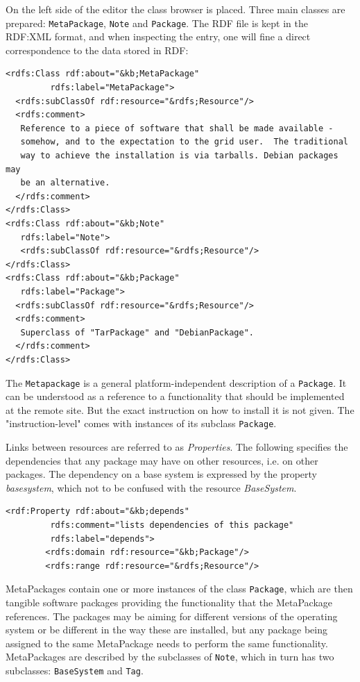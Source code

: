 On the left side of the editor the class browser is placed. Three
main classes are prepared: \texttt{MetaPackage}, \texttt{Note} and
\texttt{Package}. The RDF file is kept in the RDF:XML format, and
when inspecting the entry, one will fine a direct correspondence 
to the data stored in RDF:

\begin{verbatim}
<rdfs:Class rdf:about="&kb;MetaPackage"
         rdfs:label="MetaPackage">
  <rdfs:subClassOf rdf:resource="&rdfs;Resource"/>
  <rdfs:comment>
   Reference to a piece of software that shall be made available -
   somehow, and to the expectation to the grid user.  The traditional
   way to achieve the installation is via tarballs. Debian packages may
   be an alternative.
  </rdfs:comment>
</rdfs:Class>
<rdfs:Class rdf:about="&kb;Note"
   rdfs:label="Note">
   <rdfs:subClassOf rdf:resource="&rdfs;Resource"/>
</rdfs:Class>
<rdfs:Class rdf:about="&kb;Package"
   rdfs:label="Package">
  <rdfs:subClassOf rdf:resource="&rdfs;Resource"/>
  <rdfs:comment>
   Superclass of "TarPackage" and "DebianPackage".
  </rdfs:comment>
</rdfs:Class>
\end{verbatim}

The \texttt{Metapackage} is a general platform-independent description
of a \texttt{Package}. It can be understood as a reference to a functionality
that should be implemented at the remote site. But the exact instruction
on how to install it is not given.  The "instruction-level" comes with
instances of its subclass \texttt{Package}.

Links between resources are referred to as {\em Properties}. The following
specifies the dependencies that any package may have on other resources, i.e.
on other packages. The dependency on a base system is expressed by the
property {\em basesystem}, which not to be confused with the resource
{\em BaseSystem}.

\begin{verbatim}
<rdf:Property rdf:about="&kb;depends"
         rdfs:comment="lists dependencies of this package"
         rdfs:label="depends">
        <rdfs:domain rdf:resource="&kb;Package"/>
        <rdfs:range rdf:resource="&rdfs;Resource"/>
\end{verbatim}

MetaPackages contain one or more instances of the class
\texttt{Package}, which are then tangible software packages providing
the functionality that the MetaPackage references. The packages may
be aiming for different versions of the operating system or be different
in the way these are installed, but any package being assigned to the same
MetaPackage needs to perform the same functionality.
MetaPackages are described by the subclasses of \texttt{Note}, which
in turn has two subclasses: \texttt{BaseSystem} and
\texttt{Tag}.

